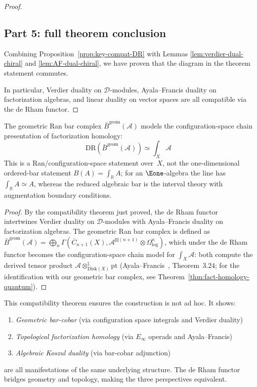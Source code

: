 \begin{proof}
\subsection*{Part 5: full theorem conclusion}

Combining Proposition~\ref{prop:key-compat-DR} with Lemmas \ref{lem:verdier-dual-chiral} and \ref{lem:AF-dual-chiral}, we have proven that the diagram in the theorem statement commutes.

In particular, Verdier duality on $\mathcal{D}$-modules, Ayala--Francis duality on factorization algebras, and linear duality on vector spaces are all compatible via the de Rham functor.
\end{proof}

\begin{corollary}\label{cor:bar-is-fh}
The geometric Ran bar complex $\bar{B}^{\text{geom}}(\mathcal{A})$
models the configuration-space chain presentation of factorization homology:
\[\text{DR}(\bar{B}^{\text{geom}}(\mathcal{A})) \simeq \int_X \mathcal{A}\]
This is a Ran/configuration-space statement over~$X$, not the
one-dimensional ordered-bar statement \(B(A)=\int_{\mathbb R}A\);
for an \(\Eone\)-algebra the line has \(\int_{\mathbb R}A\simeq A\),
whereas the reduced algebraic bar is the interval theory with
augmentation boundary conditions.
\end{corollary}

\begin{proof}
By the compatibility theorem just proved, the de Rham functor intertwines Verdier duality on $\mathcal{D}$-modules with Ayala--Francis duality on factorization algebras. The geometric Ran bar complex is defined as $\bar{B}^{\mathrm{geom}}(\mathcal{A}) = \bigoplus_n \Gamma(\overline{C}_{n+1}(X), \mathcal{A}^{\boxtimes(n+1)} \otimes \Omega^n_{\log})$, which under the de Rham functor becomes the configuration-space chain model for $\int_X \mathcal{A}$: both compute the derived tensor product $\mathcal{A} \otimes^{\mathbb{L}}_{\mathrm{Disk}(X)} \mathrm{pt}$ (Ayala--Francis~\cite{AF15}, Theorem~3.24; for the identification with our geometric bar complex, see Theorem~\ref{thm:fact-homology-quantum}).
\end{proof}

\begin{remark}\label{rem:why-verdier-AF-matters}
This compatibility theorem ensures the construction is not ad hoc. It shows:

\begin{enumerate}
\item \emph{Geometric bar-cobar} (via configuration space integrals and Verdier duality)
\item \emph{Topological factorization homology} (via $E_\infty$ operads and Ayala--Francis)
\item \emph{Algebraic Koszul duality} (via bar-cobar adjunction)
\end{enumerate}

are all manifestations of the same underlying structure. The de Rham functor bridges geometry and topology, making the three perspectives equivalent.
\end{remark}

